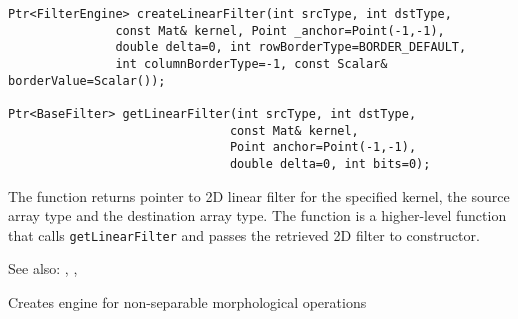 \begin{lstlisting}
Ptr<FilterEngine> createLinearFilter(int srcType, int dstType,
               const Mat& kernel, Point _anchor=Point(-1,-1),
               double delta=0, int rowBorderType=BORDER_DEFAULT,
               int columnBorderType=-1, const Scalar& borderValue=Scalar());
               
Ptr<BaseFilter> getLinearFilter(int srcType, int dstType,
                               const Mat& kernel,
                               Point anchor=Point(-1,-1),
                               double delta=0, int bits=0);
\end{lstlisting}
\begin{description}
\end{description}

The function returns pointer to 2D linear filter for the specified kernel, the source array type and the destination array type. The function is a higher-level function that calls \texttt{getLinearFilter} and passes the retrieved 2D filter to  constructor.

See also: , , 

Creates engine for non-separable morphological operations

